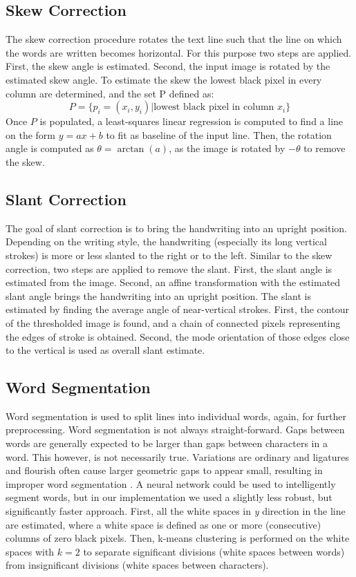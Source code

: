 \documentclass[conference]{IEEEtran}
\begin{document}
\subsection{Skew Correction}
The skew correction procedure rotates the text line such that the line on which the words are written becomes horizontal. For this purpose two steps are applied. First, the skew angle is estimated. Second, the input image is rotated by the estimated skew angle. 
To estimate the skew the lowest black pixel in every column are determined, and the set P defined as:
\begin{equation}
P = \{p_i = (x_i, y_i) | \text{lowest black pixel in column } x_i\}
\end{equation}
Once $P$ is populated, a least-squares linear regression is computed to find a line on the form $y = ax + b$ to fit as baseline of the input line. Then, the rotation angle is computed as $\theta = \arctan(a)$, as the image is rotated by $- \theta$ to remove the skew.
\subsection{Slant Correction}
The goal of slant correction is to bring the handwriting into an upright position. Depending on the writing style, the handwriting (especially its long vertical strokes) is more or less slanted to the right or to the left. Similar to the skew correction, two steps are applied to remove the slant. First, the slant angle is estimated from the image. Second, an affine transformation with the estimated slant angle brings the handwriting into an upright position.
The slant is estimated by finding the average angle of near-vertical strokes.  First, the contour of the thresholded image is found, and a chain of connected pixels representing the edges of stroke is obtained. Second, the mode orientation of those edges close to the vertical is used as overall slant estimate.  


\subsection{Word Segmentation}
Word segmentation is used to split lines into individual words, again, for further preprocessing. 
Word segmentation is not always straight-forward. Gaps between words are generally expected to be larger than gaps between characters in a word. This however, is not necessarily true. Variations are ordinary and ligatures and flourish often cause larger geometric gaps to appear small, resulting in improper word segmentation \cite{springerlink:10.1007/s100320050035}. A neural network could be used to intelligently segment words, but in our implementation we used a slightly less robust, but significantly faster approach. First, all the white spaces in \textit{y} direction in the line are estimated, where a white space is defined as one or more (consecutive) columns of zero black pixels. Then, k-means clustering is performed on the white spaces with $k=2$ to separate significant divisions (white spaces between words) from insignificant divisions (white spaces between characters).
 
\end{document}

